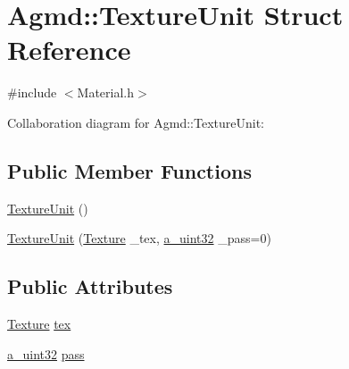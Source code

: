 \hypertarget{struct_agmd_1_1_texture_unit}{\section{Agmd\+:\+:Texture\+Unit Struct Reference}
\label{struct_agmd_1_1_texture_unit}
}


{\ttfamily \#include $<$Material.\+h$>$}



Collaboration diagram for Agmd\+:\+:Texture\+Unit\+:
\subsection*{Public Member Functions}
\begin{DoxyCompactItemize}
\item 
\hyperlink{struct_agmd_1_1_texture_unit_ad5846d2a3e2678438d54112bfb818a29}{Texture\+Unit} ()
\item 
\hyperlink{struct_agmd_1_1_texture_unit_acab5a3f7f9064199111e0a29400b9ec1}{Texture\+Unit} (\hyperlink{class_agmd_1_1_texture}{Texture} \+\_\+tex, \hyperlink{_common_defines_8h_a964296f9770051b9e4807b1f180dd416}{a\+\_\+uint32} \+\_\+pass=0)
\end{DoxyCompactItemize}
\subsection*{Public Attributes}
\begin{DoxyCompactItemize}
\item 
\hyperlink{class_agmd_1_1_texture}{Texture} \hyperlink{struct_agmd_1_1_texture_unit_a520920712d784307d9ca50d5b5d2d741}{tex}
\item 
\hyperlink{_common_defines_8h_a964296f9770051b9e4807b1f180dd416}{a\+\_\+uint32} \hyperlink{struct_agmd_1_1_texture_unit_a796c3cde1d494cf42c397a7c67005f6f}{pass}
\end{DoxyCompactItemize}


